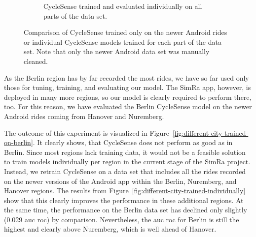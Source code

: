 \begin{figure}[t]
\begin{subfigure}[b]{0.475\textwidth}
		\caption{\small CycleSense trained and evaluated individually on all parts of the data set. \newline}
		\label{fig:individually}
	\end{subfigure}
	\caption{Comparison of CycleSense trained only on the newer Android rides or individual CycleSense models trained for each part of the data set. Note that only the newer Android data set was manually cleaned.}
	\label{fig:comp-trainedonone-individually}
\end{figure}

As the Berlin region has by far recorded the most rides, we have so far used only those for tuning, training, and evaluating our model.
The SimRa app, however, is deployed in many more regions, so our model is clearly required to perform there, too.
For this reason, we have evaluated the Berlin CycleSense model on the newer Android rides coming from Hanover and Nuremberg.

The outcome of this experiment is visualized in Figure~\ref{fig:different-city-trained-on-berlin}.
It clearly shows, that CycleSense does not perform as good as in Berlin.
Since most regions lack training data, it would not be a feasible solution to train models individually per region in the current stage of the SimRa project.
Instead, we retrain CycleSense on a data set that includes all the rides recorded on the newer versions of the Android app within the Berlin, Nuremberg, and Hanover regions.
The results from Figure~\ref{fig:different-city-trained-individually} show that this clearly improves the performance in these additional regions.
At the same time, the performance on the Berlin data set has declined only slightly (0.029 \ac{auc} \ac{roc}) by comparison.
Nevertheless, the \ac{auc} \ac{roc} for Berlin is still the highest and clearly above Nuremberg, which is well ahead of Hanover.

